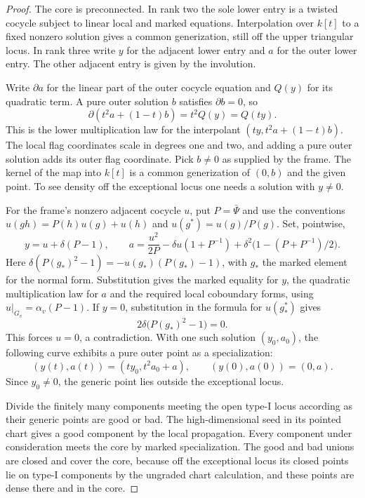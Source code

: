 \begin{proof}
The core is preconnected. In rank two the sole lower entry is
a twisted cocycle subject to linear local and marked equations.
Interpolation over \(k[t]\) to a fixed nonzero solution gives
a common generization, still off the upper triangular locus.
In rank three write \(y\) for the adjacent lower entry and
\(a\) for the outer lower entry. The other adjacent entry
is given by the involution.

Write \(\partial a\) for the linear part of the outer
cocycle equation and \(Q(y)\) for its quadratic term.
A pure outer solution \(b\) satisfies \(\partial b=0\),
so
\[
        \partial(t^2 a+(1-t)b)=t^2 Q(y)=Q(ty).
\]
This is the lower multiplication law for the interpolant
\((ty,t^2a+(1-t)b)\). The local flag coordinates scale
in degrees one and two, and adding a pure outer solution adds
its outer flag coordinate. Pick \(b\ne0\) as supplied by the
frame. The kernel of the map into \(k[t]\) is a common
generization of \((0,b)\) and the given point. To see density
off the exceptional locus one needs a solution with \(y\ne0\).

For the frame's nonzero adjacent cocycle \(u\), put \(P=\bar\Psi\)
and use the conventions \(u(gh)=P(h)u(g)+u(h)\) and
\(u(g^*)=u(g)/P(g)\). Set, pointwise,
\[
 y=u+\delta(P-1),\qquad
 a=\frac{u^2}{2P}-\delta u(1+P^{-1})
                +\delta^2\bigl(1-(P+P^{-1})/2\bigr).
\]
Here \(\delta(P(g_*)^2-1)=-u(g_*)(P(g_*)-1)\), with
\(g_*\) the marked element for the normal form. Substitution
gives the marked equality for \(y\), the quadratic multiplication
law for \(a\) and the required local coboundary forms, using
\(u|_{G_v}=\alpha_v(P-1)\). If \(y=0\), substitution in the formula for \(u(g_*^*)\) gives
\[
 2\delta\bigl(P(g_*)^2-1\bigr)=0 .
\]
This forces \(u=0\), a contradiction. With one such solution
\((y_0,a_0)\), the following curve exhibits a pure outer point as a specialization: 
\[
 (y(t),a(t))=(t y_0,t^2a_0+a),\qquad (y(0),a(0))=(0,a).
\]
 Since \(y_0\ne0\), the generic point lies outside the exceptional locus.

Divide the finitely many components meeting the open type-I
locus according as their generic points are good or bad.
The high-dimensional seed in its pointed chart gives a good
component by the local propagation. Every component under
consideration meets the core by marked specialization.
The good and bad unions are closed and cover the core, because
off the exceptional locus its closed points lie on type-I
components by the ungraded chart calculation, and these
points are dense there and in the core.


\end{proof}
